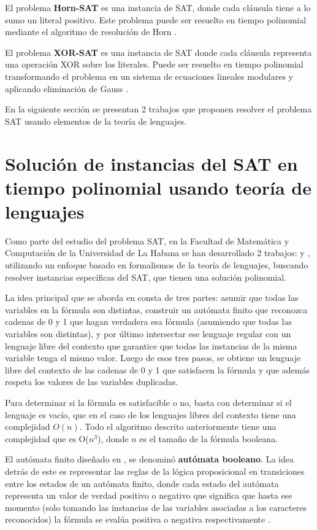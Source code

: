 El problema \textbf{Horn-SAT} es una instancia de SAT, donde cada cláusula tiene a lo sumo un literal positivo.  Este problema puede ser resuelto en tiempo polinomial mediante el algoritmo de resolución de Horn \cite{hornsatbib}.

El problema \textbf{XOR-SAT} es una instancia de SAT donde cada cláusula representa una operación XOR sobre los literales. Puede ser resuelto en tiempo polinomial transformando el problema en un sistema de ecuaciones lineales modulares y aplicando eliminación de Gauss \cite{xorsatbib}.

En la siguiente sección se presentan 2 trabajos que proponen resolver el problema SAT usando elementos de la teoría de lenguajes.

\section{Solución de instancias del SAT en tiempo polinomial usando teoría de lenguajes}

Como parte del estudio del problema SAT, en la Facultad de Matemática y Computación de la Universidad de La Habana
se han desarrollado 2 trabajos: \cite{aCFSAT} y \cite{aSRCSAT}, utilizando un enfoque basado en formalismos de la teoría de lenguajes, buscando resolver 
instancias específicas del SAT, que tienen una solución polinomial.

La idea principal que se aborda en \cite{aCFSAT} consta de tres partes: asumir que todas las variables en la fórmula son distintas, construir un autómata finito que reconozca cadenas de 0 y 1 que hagan verdadera esa fórmula (asumiendo que todas las variables son distintas), y por último intersectar ese lenguaje regular con un lenguaje libre del contexto que garantice que todas las instancias de la misma variable tenga el mismo valor. Luego de esos tres pasos, se obtiene un lenguaje libre del contexto de las cadenas de 0 y 1 que satisfacen la fórmula y que además respeta los valores de las variables duplicadas.

Para determinar si la fórmula es satisfacible o no, basta con determinar si el lenguaje es vacío, que en el caso de los lenguajes libres del contexto tiene una complejidad $O(n)$. Todo el algoritmo descrito anteriormente tiene una complejidad que es O($n^3$), donde $n$ es el tamaño de la fórmula booleana.

El autómata finito diseñado en \cite{aCFSAT}, se denominó \textbf{autómata booleano}. La idea detrás de este es representar las reglas de la lógica proposicional en transiciones entre los estados de un autómata finito, donde cada estado del autómata representa un valor de verdad positivo o negativo que significa que hasta ese momento (solo tomando las instancias de las variables asociadas a los caracteres reconocidos) la fórmula se evalúa positiva o negativa respectivamente \cite{aCFSAT}.

